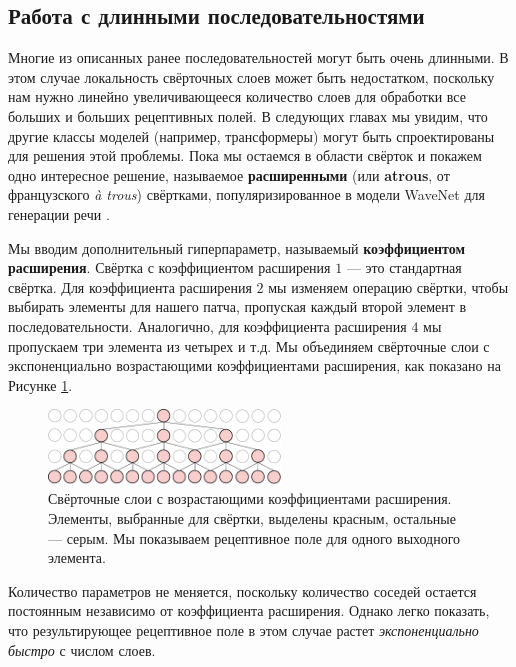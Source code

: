 \subsection{Работа с длинными последовательностями}

Многие из описанных ранее последовательностей могут быть очень длинными. В этом случае локальность свёрточных слоев может быть недостатком, поскольку нам нужно линейно увеличивающееся количество слоев для обработки все больших и больших рецептивных полей. В следующих главах мы увидим, что другие классы моделей (например, трансформеры) могут быть спроектированы для решения этой проблемы. Пока мы остаемся в области свёрток и покажем одно интересное решение, называемое \textbf{расширенными} (или \textbf{atrous}, от французского \textit{à trous}) свёртками, популяризированное в модели WaveNet для генерации речи \cite{oord2016wavenet}.

Мы вводим дополнительный гиперпараметр, называемый \textbf{коэффициентом расширения}. Свёртка с коэффициентом расширения $1$ — это стандартная свёртка. Для коэффициента расширения $2$ мы изменяем операцию свёртки, чтобы выбирать элементы для нашего патча, пропуская каждый второй элемент в последовательности. Аналогично, для коэффициента расширения $4$ мы пропускаем три элемента из четырех и т.д. Мы объединяем свёрточные слои с экспоненциально возрастающими коэффициентами расширения, как показано на Рисунке \ref{fig:convolution_with_dilation}.

\begin{figure}
    \centering
    \hspace{1em}\includegraphics[width=0.55\textwidth]{images/convolution_with_dilation}
    \caption{Свёрточные слои с возрастающими коэффициентами расширения. Элементы, выбранные для свёртки, выделены красным, остальные — серым. Мы показываем рецептивное поле для одного выходного элемента.}
    \label{fig:convolution_with_dilation}
\end{figure}

Количество параметров не меняется, поскольку количество соседей остается постоянным независимо от коэффициента расширения. Однако легко показать, что результирующее рецептивное поле в этом случае растет \textit{экспоненциально быстро} с числом слоев.

